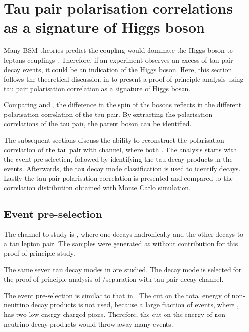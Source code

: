 \section{Tau pair polarisation correlations as a signature of Higgs boson}
\label{sec:tauHZ}

Many BSM theories predict the \HigssTauTau coupling would dominate the Higgs boson to leptons couplings  \cite{Duperrin:2008in}. Therefore, if an experiment observes an excess of tau pair decay events, it could be an indication of the Higgs boson. Here, this section follows the theoretical discussion in  to present a proof-of-principle analysis using tau pair polarisation correlation as a signature of Higgs boson.


Comparing \HiggsToTauTau  and \ZToTauTau, the difference in the spin of the bosons reflects in the different polarisation correlation of the tau pair. By extracting the polarisation correlations of the tau pair, the parent boson can be identified.

The subsequent sections discuss the ability to reconstruct the polarisation correlation of the tau pair with \ZToTauTau channel, where both \tauToPion. The analysis starts with the event pre-selection, followed by identifying the tau decay products in the events. Afterwards, the tau decay mode classification is used to identify \tauToPion decays. Lastly the tau pair polarisation correlation is presented and compared to the correlation distribution obtained with Monte Carlo simulation.

\subsection{Event pre-selection}

The channel to study is \HepProcess{\Pep \Pem \to \PZ \PZ}, where one \PZ decays hadronically and the other \PZ decays to a tau lepton pair. The samples were generated at  without \ISR contribution for this proof-of-principle study.

The same seven tau decay modes in  are studied. The \tauToPion decay mode is selected for the proof-of-principle analysis of \PHiggs/\PZ separation with tau pair decay channel.

The event pre-selection is similar to that in . The cut on the total energy of non-neutrino decay products is not used, because a large fraction of \ZToTauTau events, where \tauToPion, has two low-energy charged pions. Therefore, the cut on the energy of non-neutrino decay products would throw away many events.


